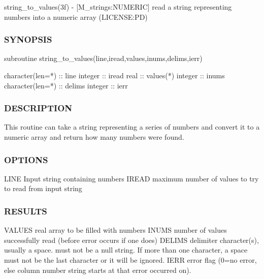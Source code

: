 string\+\_\+to\+\_\+values(3f) -\/ \mbox{[}M\+\_\+strings\+:N\+U\+M\+E\+R\+IC\mbox{]} read a string representing numbers into a numeric array (L\+I\+C\+E\+N\+SE\+:PD) 

\subsubsection*{S\+Y\+N\+O\+P\+S\+IS}

\begin{DoxyVerb}   subroutine string_to_values(line,iread,values,inums,delims,ierr)

    character(len=*) :: line
    integer          :: iread
    real             :: values(*)
    integer          :: inums
    character(len=*) :: delims
    integer          :: ierr
\end{DoxyVerb}
 \subsubsection*{D\+E\+S\+C\+R\+I\+P\+T\+I\+ON}

This routine can take a string representing a series of numbers and convert it to a numeric array and return how many numbers were found.

\subsubsection*{O\+P\+T\+I\+O\+NS}

\begin{DoxyVerb}   LINE     Input string containing numbers
   IREAD    maximum number of values to try to read from input string
\end{DoxyVerb}


\subsubsection*{R\+E\+S\+U\+L\+TS}

\begin{DoxyVerb}   VALUES   real array to be filled with numbers
   INUMS    number of values successfully read (before error occurs
            if one does)
   DELIMS   delimiter character(s), usually a space. must not be a
            null string. If more than one character, a space must
            not be the last character or it will be ignored.
   IERR     error flag (0=no error, else column number string starts
            at that error occurred on).
\end{DoxyVerb}


